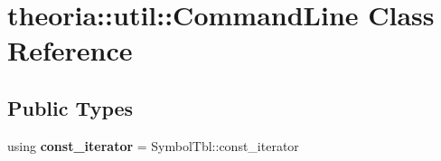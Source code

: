 \hypertarget{classtheoria_1_1util_1_1CommandLine}{\section{theoria\+:\+:util\+:\+:Command\+Line Class Reference}
\label{classtheoria_1_1util_1_1CommandLine}
}
\subsection*{Public Types}
\begin{DoxyCompactItemize}
\item 
\hypertarget{classtheoria_1_1util_1_1CommandLine_a729aa00feedd8257d4caafc73ac6ee63}{using {\bfseries const\+\_\+iterator} = Symbol\+Tbl\+::const\+\_\+iterator}\label{classtheoria_1_1util_1_1CommandLine_a729aa00feedd8257d4caafc73ac6ee63}

\end{DoxyCompactItemize}
